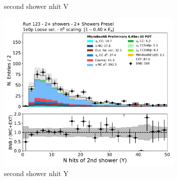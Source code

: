 \begin{figure}[H]
\begin{subfigure}{0.3\textwidth}
    \caption{second shower nhit V}
    \end{subfigure}
    \begin{subfigure}{0.3\textwidth}
    \includegraphics[width=1.0\textwidth]{Sidebands/Figures/TwoShr_1e0pSel/loose/secondshower_Y_nhit.pdf}
    \caption{second shower nhit Y}
    \end{subfigure}
    \caption{} 
    \label{fig:HE_1eNp_1}
\end{figure}

